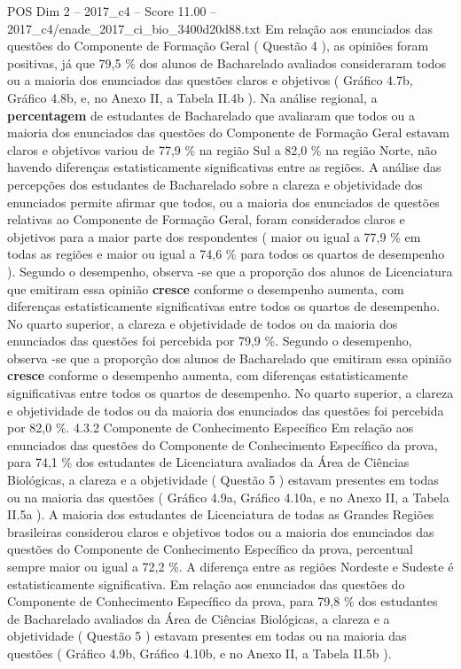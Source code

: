 \begin{textsample}{POS Dim 2 – 2017\_c4 – Score 11.00 – 2017\_c4/enade\_2017\_ci\_bio\_3400d20d88.txt}
Em relação aos enunciados das questões do Componente de Formação Geral ( Questão 4 ), as opiniões foram positivas, já que 79,5 \% dos alunos de Bacharelado avaliados consideraram todos ou a maioria dos enunciados das questões claros e objetivos ( Gráfico 4.7b, Gráfico 4.8b, e, no Anexo II, a Tabela II.4b ).
Na análise regional, a \textbf{percentagem} de estudantes de Bacharelado que avaliaram que todos ou a maioria dos enunciados das questões do Componente de Formação Geral estavam claros e objetivos variou de 77,9 \% na região Sul a 82,0 \% na região Norte, não havendo diferenças estatisticamente significativas entre as regiões.
A análise das percepções dos estudantes de Bacharelado sobre a clareza e objetividade dos enunciados permite afirmar que todos, ou a maioria dos enunciados de questões relativas ao Componente de Formação Geral, foram considerados claros e objetivos para a maior parte dos respondentes ( maior ou igual a 77,9 \% em todas as regiões e maior ou igual a 74,6 \% para todos os quartos de desempenho ).
Segundo o desempenho, observa -se que a proporção dos alunos de Licenciatura que emitiram essa opinião \textbf{cresce} conforme o desempenho aumenta, com diferenças estatisticamente significativas entre todos os quartos de desempenho.
No quarto superior, a clareza e objetividade de todos ou da maioria dos enunciados das questões foi percebida por 79,9 \%.
Segundo o desempenho, observa -se que a proporção dos alunos de Bacharelado que emitiram essa opinião \textbf{cresce} conforme o desempenho aumenta, com diferenças estatisticamente significativas entre todos os quartos de desempenho.
No quarto superior, a clareza e objetividade de todos ou da maioria dos enunciados das questões foi percebida por 82,0 \%. 4.3.2 Componente de Conhecimento Específico Em relação aos enunciados das questões do Componente de Conhecimento Específico da prova, para 74,1 \% dos estudantes de Licenciatura avaliados da Área de Ciências Biológicas, a clareza e a objetividade ( Questão 5 ) estavam presentes em todas ou na maioria das questões ( Gráfico 4.9a, Gráfico 4.10a, e no Anexo II, a Tabela II.5a ).
A maioria dos estudantes de Licenciatura de todas as Grandes Regiões brasileiras considerou claros e objetivos todos ou a maioria dos enunciados das questões do Componente de Conhecimento Específico da prova, percentual sempre maior ou igual a 72,2 \%.
A diferença entre as regiões Nordeste e Sudeste é estatisticamente significativa.
Em relação aos enunciados das questões do Componente de Conhecimento Específico da prova, para 79,8 \% dos estudantes de Bacharelado avaliados da Área de Ciências Biológicas, a clareza e a objetividade ( Questão 5 ) estavam presentes em todas ou na maioria das questões ( Gráfico 4.9b, Gráfico 4.10b, e no Anexo II, a Tabela II.5b ).

\end{textsample}
